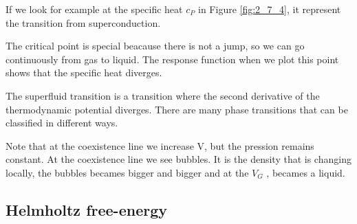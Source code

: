 \documentclass[../main/main.tex]{subfiles}
\begin{document}
If we look for example at the specific heat \( c_P \) in Figure \ref{fig:2_7_4}, it represent the transition from superconduction.

The critical point is special beacause there is not a jump, so we can go continuously from gas to liquid. The response function when we plot this point shows that the specific heat diverges.

 The superfluid transition is a transition where the second derivative of the thermodynamic potential diverges. There are many phase transitions that can be classified in different ways.

 \begin{remark}
Note that at the coexistence line we increase V, but the pression remains constant. At the coexistence line we see bubbles. It is the density that is changing locally, the bubbles becames bigger and bigger and at the \( V_G \) , becames a liquid.
 \end{remark}



\subsection{Helmholtz free-energy}
\end{document}
